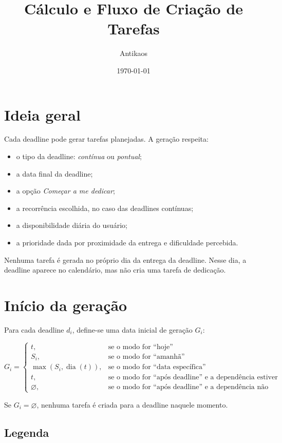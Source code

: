\documentclass[12pt,a4paper]{article}
\title{Cálculo e Fluxo de Criação de Tarefas}
\author{Antikaos}
\date{\today}
\begin{document}
\maketitle

\section{Ideia geral}

Cada deadline pode gerar tarefas planejadas. A geração respeita:

\begin{itemize}
    \item o tipo da deadline: \textit{contínua} ou \textit{pontual};
    \item a data final da deadline;
    \item a opção \textit{Começar a me dedicar};
    \item a recorrência escolhida, no caso das deadlines contínuas;
    \item a disponibilidade diária do usuário;
    \item a prioridade dada por proximidade da entrega e dificuldade percebida.
\end{itemize}

Nenhuma tarefa é gerada no próprio dia da entrega da deadline. Nesse dia, a deadline aparece no calendário, mas não cria uma tarefa de dedicação.

\section{Início da geração}

Para cada deadline $d_i$, define-se uma data inicial de geração $G_i$:

\[
G_i =
\begin{cases}
t, & \text{se o modo for ``hoje''} \\
S_i, & \text{se o modo for ``amanhã''} \\
\max(S_i, \operatorname{dia}(t)), & \text{se o modo for ``data específica''} \\
t, & \text{se o modo for ``após deadline'' e a dependência estiver concluída} \\
\varnothing, & \text{se o modo for ``após deadline'' e a dependência não estiver concluída}
\end{cases}
\]

Se $G_i = \varnothing$, nenhuma tarefa é criada para a deadline naquele momento.

\subsection*{Legenda}
\end{document}
